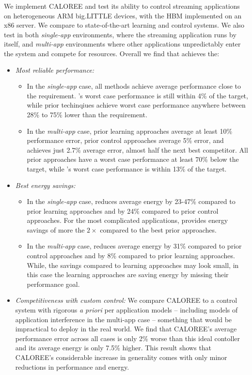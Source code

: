 We implement CALOREE and test its ability to control streaming
applications on heterogeneous ARM big.LITTLE devices, with the HBM
implemented on an x86 server.  We compare to state-of-the-art learning
and control systems.  We also test \SYSTEM{} in both \emph{single-app}
environments, where the streaming application runs by itself, and
\emph{multi-app} environments where other applications unpredictably
enter the system and compete for resources. Overall we find that
\SYSTEM{} achieves the:
\begin{itemize}
\item \textit{Most reliable performance:} 
  \begin{itemize} 
  \item In the \emph{single-app} case, all methods achieve average
    performance close to the requirement.  \SYSTEM{}'s worst case
    performance is still within 4\% of the target, while prior
    techinqiues achieve worst case performance anywhere between 28\%
    to 75\% lower than the requirement.
  \item In the \emph{multi-app} case, prior learning approaches
    average at least 10\% performance error, prior control approaches
    average 5\% error, and \SYSTEM{} achieves just 2.7\% average
    error, almost half the next best competitor.  All prior approaches
    have a worst case performance at least 70\% below the target,
    while \SYSTEM{}'s worst case performance is within 13\% of the
    target.
    \end{itemize}
  \item \textit{Best energy savings:}
    \begin{itemize}
    \item In the \emph{single-app} case, \SYSTEM{} reduces average
      energy by 23-47\% compared to prior learning approaches and by
      24\% compared to prior control approaches.  For the most
      complicated applications, \SYSTEM{} provides energy savings of
      more the $2\times$ compared to the best prior approaches.
    \item In the \emph{multi-app} case, \SYSTEM{} reduces average
      energy by 31\% compared to prior control approaches and by 8\%
      compared to prior learning approaches.  While, the savings
      compared to learning approaches may look small, in this case the
      learning approaches are saving energy by missing their
      performance goal.  
    \end{itemize}
  \item \textit{Competitiveness with custom control:} We compare
    CALOREE to a control system with rigorous \emph{a priori} per
    application models -- including models of application interference
    in the multi-app case -- something that would be impractical to
    deploy in the real world.  We find that CALOREE's average
    performance error across all cases is only 2\% worse than this
    ideal contoller and its average energy is only 7.5\% higher.  This
    result shows that CALOREE's considerable increase in generality
    comes with only minor reductions in performance and energy.
\end{itemize}

